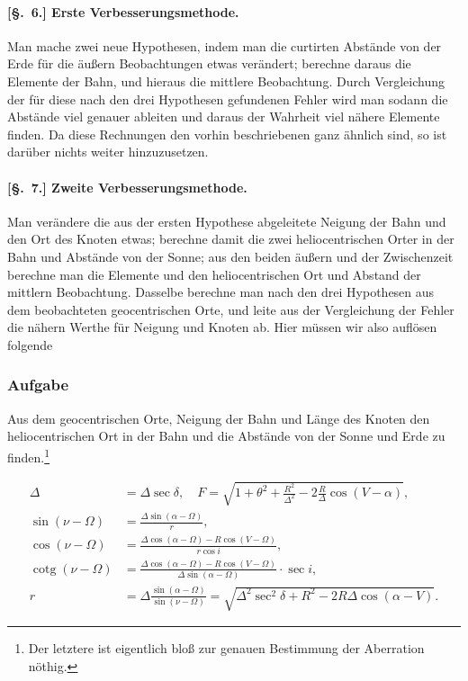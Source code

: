 \documentclass[12pt,a4paper]{article}
\DeclareMathOperator{\cotg}{cotg}
\theoremstyle{plain}
\theoremstyle{definition}
\theoremstyle{remark}
\begin{document}
\newpage

\paragraph{[§.~6.] Erste Verbesserungsmethode.}

Man mache zwei neue Hypothesen, indem man die curtirten Abstände von der Erde für die äußern Beobachtungen etwas verändert; berechne daraus die Elemente der Bahn, und hieraus die mittlere Beobachtung. Durch Vergleichung der für diese nach den drei Hypothesen gefundenen Fehler wird man sodann die Abstände viel genauer ableiten und daraus der Wahrheit viel nähere Elemente finden. Da diese Rechnungen den vorhin beschriebenen ganz ähnlich sind, so ist darüber nichts weiter hinzuzusetzen.

\medskip

\paragraph{[§.~7.] Zweite Verbesserungsmethode.}

Man verändere die aus der ersten Hypothese abgeleitete Neigung der Bahn und den Ort des Knoten etwas; berechne damit die zwei heliocentrischen Orter in der Bahn und Abstände von der Sonne; aus den beiden äußern und der Zwischenzeit berechne man die Elemente und den heliocentrischen Ort und Abstand der mittlern Beobachtung. Dasselbe berechne man nach den drei Hypothesen aus dem beobachteten geocentrischen Orte, und leite aus der Vergleichung der Fehler die nähern Werthe für Neigung und Knoten ab. Hier müssen wir also auflösen folgende

\newpage

\subsubsection*{Aufgabe}

Aus dem geocentrischen Orte, Neigung der Bahn und Länge des Knoten den heliocentrischen Ort in der Bahn und die Abstände von der Sonne und Erde zu finden.\footnote{Der letztere ist eigentlich bloß zur genauen Bestimmung der Aberration nöthig.}

\begin{align*}
\Delta &= \Delta \sec\delta, \quad F = \sqrt{1 + \theta^2 + \frac{R^2}{\Delta^2} - 2\frac{R}{\Delta} \cos(V - \alpha)}, \\
\sin(\nu - \Omega) &= \frac{\Delta \sin(\alpha - \Omega)}{r}, \\
\cos(\nu - \Omega) &= \frac{\Delta \cos(\alpha - \Omega) - R \cos(V - \Omega)}{r \cos i}, \\
\cotg(\nu - \Omega) &= \frac{\Delta \cos(\alpha - \Omega) - R \cos(V - \Omega)}{\Delta \sin(\alpha - \Omega)} \cdot \sec i, \\
r &= \Delta \frac{\sin(\alpha - \Omega)}{\sin(\nu - \Omega)} = \sqrt{\Delta^2 \sec^2\delta + R^2 - 2R\Delta \cos(\alpha - V)}.
\end{align*}
\end{document}
